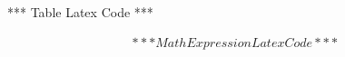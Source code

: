 \documentclass[conference]{IEEEtran}
\begin{document}
\begin{table*}
  *** Table Latex Code ***
\end{table*}

\begin{align*}
  *** Math Expression Latex Code ***
\end{align*}
\end{document}
